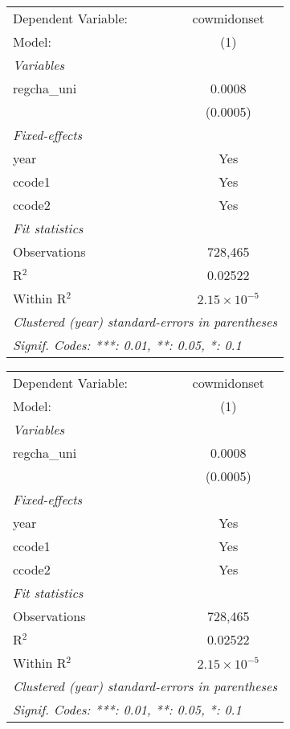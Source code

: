 \begingroup
\centering
\begin{tabular}{lc}
   \tabularnewline \midrule \midrule
   Dependent Variable: & cowmidonset\\  
   Model:              & (1)\\  
   \midrule
   \emph{Variables}\\
   regcha\_uni         & 0.0008\\   
                       & (0.0005)\\   
   \midrule
   \emph{Fixed-effects}\\
   year                & Yes\\  
   ccode1              & Yes\\  
   ccode2              & Yes\\  
   \midrule
   \emph{Fit statistics}\\
   Observations        & 728,465\\  
   R$^2$               & 0.02522\\  
   Within R$^2$        & $2.15\times 10^{-5}$\\   
   \midrule \midrule
   \multicolumn{2}{l}{\emph{Clustered (year) standard-errors in parentheses}}\\
   \multicolumn{2}{l}{\emph{Signif. Codes: ***: 0.01, **: 0.05, *: 0.1}}\\
\end{tabular}
\par\endgroup



\begingroup
\centering
\begin{tabular}{lc}
   \tabularnewline \midrule \midrule
   Dependent Variable: & cowmidonset\\  
   Model:              & (1)\\  
   \midrule
   \emph{Variables}\\
   regcha\_uni         & 0.0008\\   
                       & (0.0005)\\   
   \midrule
   \emph{Fixed-effects}\\
   year                & Yes\\  
   ccode1              & Yes\\  
   ccode2              & Yes\\  
   \midrule
   \emph{Fit statistics}\\
   Observations        & 728,465\\  
   R$^2$               & 0.02522\\  
   Within R$^2$        & $2.15\times 10^{-5}$\\   
   \midrule \midrule
   \multicolumn{2}{l}{\emph{Clustered (year) standard-errors in parentheses}}\\
   \multicolumn{2}{l}{\emph{Signif. Codes: ***: 0.01, **: 0.05, *: 0.1}}\\
\end{tabular}
\par\endgroup



